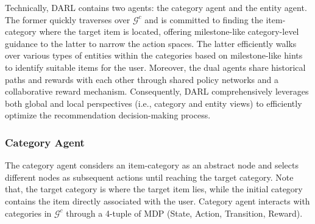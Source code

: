 \documentclass[conference]{IEEEtran}
\begin{document}
Technically, DARL contains two agents: the category agent and the entity agent. The former quickly traverses over $\mathcal{G}^c$ and is committed to finding the item-category where the target item is located, offering milestone-like category-level guidance to the latter to narrow the action spaces. The latter efficiently walks over various types of entities within the categories based on milestone-like hints to identify suitable items for the user. Moreover, the dual agents share historical paths and rewards with each other through shared policy networks and a collaborative reward mechanism. Consequently, DARL comprehensively leverages both global and local perspectives (i.e., category and entity views)  to efficiently optimize the recommendation decision-making process.





\subsubsection{Category Agent}

The category agent considers an item-category as an abstract node and selects different nodes as subsequent actions until reaching the target category. Note that, the target category is where the target item lies, while the initial category contains the item directly associated with the user. Category agent interacts with categories in $\mathcal{G}^c$ through a 4-tuple of MDP (State, Action, Transition, Reward). 

\end{document}
